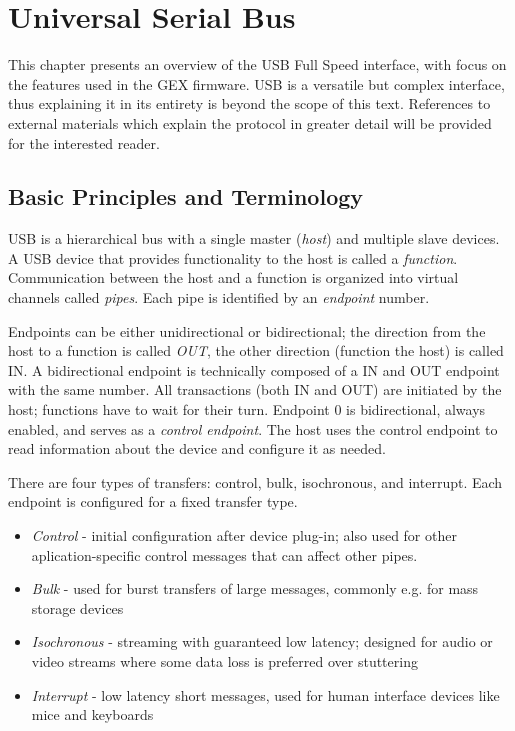 \chapter{Universal Serial Bus}

This chapter presents an overview of the USB Full Speed interface, with focus on the features used in the GEX firmware. USB is a versatile but complex interface, thus explaining it in its entirety is beyond the scope of this text. References to external materials which explain the protocol in greater detail will be provided for the interested reader.

\section{Basic Principles and Terminology}

USB is a hierarchical bus with a single master (\textit{host}) and multiple slave devices. A USB device that provides functionality to the host is called a \textit{function}. Communication between the host and a function is organized into virtual channels called \textit{pipes}. Each pipe is identified by an \textit{endpoint} number. 

Endpoints can be either unidirectional or bidirectional; the direction from the host to a function is called \textit{OUT}, the other direction (function the host) is called IN. A bidirectional endpoint is technically composed of a IN and OUT endpoint with the same number. All transactions (both IN and OUT) are initiated by the host; functions have to wait for their turn. Endpoint 0 is bidirectional, always enabled, and serves as a \textit{control endpoint}. The host uses the control endpoint to read information about the device and configure it as needed.

There are four types of transfers: control, bulk, isochronous, and interrupt. Each endpoint is configured for a fixed transfer type. 

\begin{itemize}
	\item \textit{Control} - initial configuration after device plug-in; also used for other aplication-specific control messages that can affect other pipes.
	\item \textit{Bulk} - used for burst transfers of large messages, commonly e.g. for mass storage devices
	\item \textit{Isochronous} - streaming with guaranteed low latency; designed for audio or video streams where some data loss is preferred over stuttering
	\item \textit{Interrupt} - low latency short messages, used for human interface devices like mice and keyboards
\end{itemize}

